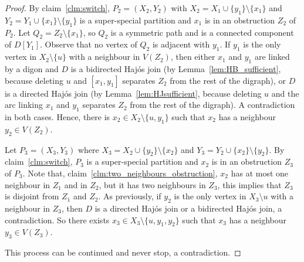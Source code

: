 \begin{proof}
    By claim~\ref{clm:switch}, $P_2=(X_2, Y_2)$ with $X_2= X_1 \cup \{y_1\} \setminus \{x_1\}$ and $Y_2 = Y_1 \cup \{x_1\} \setminus \{y_1\}$ is a super-special partition and $x_1$ is in an obstruction $Z_2$ of $P_2$. Let $Q_2 = Z_2 \setminus \{x_1\}$, so $Q_2$ is a symmetric path and is a connected component of $D[Y_1]$. 
    Observe that no vertex of $Q_2$ is adjacent with $y_1$. 
    If $y_1$ is the only vertex in $X_2 \setminus \{u\}$ with a neighbour in $V(Z_2)$, then either $x_1$ and $y_1$ are linked by a digon and $D$ is a bidirected Haj\'os join (by Lemma~\ref{lem:HB_sufficient}, because deleting $u$ and $[x_1, y_1]$ separates $Z_2$ from the rest of the digraph), or $D$ is a directed Haj\'os join (by Lemma~\ref{lem:HJsufficient}, because deleting $u$ and the arc linking $x_1$ and $y_1$ separates $Z_2$ from the rest of the digraph). A contradiction in both cases. 
    Hence, there is $x_2 \in X_2 \setminus \{u, y_1\}$ such that $x_2$ has a neighbour $y_2 \in V(Z_2)$. %
    
    Let $P_3=(X_3, Y_3)$ where $X_3 = X_2 \cup \{y_2\} \setminus \{x_2\}$ and $Y_3 = Y_2 \cup \{x_2\} \setminus \{y_2\}$. By claim~\ref{clm:switch}, $P_3$ is a super-special partition and $x_2$ is in an obstruction $Z_3$ of $P_3$.  
    Note that, claim~\ref{clm:two_neighbours_obstruction},  $x_2$ has at most one neighbour in $Z_1$ and in $Z_2$, but it has two neighbours in $Z_3$, this implies that  $Z_3$ is disjoint from $Z_1$ and $Z_2$. As previously, if $y_2$ is the only vertex in $X_3 \setminus u$ with a neighbour in $Z_3$, then $D$ is a directed Haj\'os join or a bidirected Haj\'os join, a contradiction. 
    So there exists $x_3 \in X_3 \setminus \{u, y_1, y_2\}$ such that $x_3$ has a neighbour $y_3 \in V(Z_3)$. 

    This process can be continued and never stop, a contradiction. 
    
    


\end{proof}
